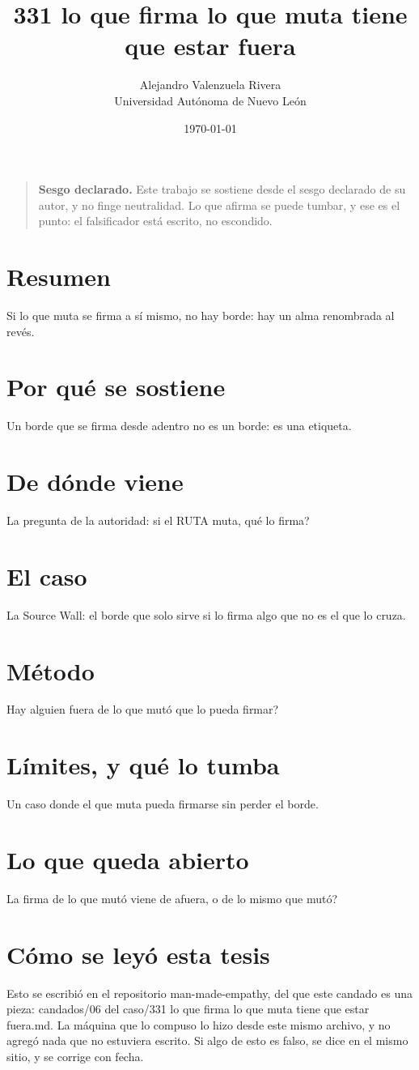 \documentclass[11pt,a4paper]{article}
\title{331 lo que firma lo que muta tiene que estar fuera}
\author{Alejandro Valenzuela Rivera\\\small Universidad Autónoma de Nuevo León}
\date{\today}
\begin{document}
\maketitle

\begin{quote}
\textbf{Sesgo declarado.} Este trabajo se sostiene desde el sesgo declarado de su autor, y no finge neutralidad. Lo que afirma se puede tumbar, y ese es el punto: el falsificador está escrito, no escondido.
\end{quote}

\section*{Resumen}
Si lo que muta se firma a sí mismo, no hay borde: hay un alma renombrada al revés.

\section{Por qué se sostiene}
Un borde que se firma desde adentro no es un borde: es una etiqueta.

\section{De dónde viene}
La pregunta de la autoridad: si el RUTA muta, \textquestiondown{}qué lo firma?

\section{El caso}
La Source Wall: el borde que solo sirve si lo firma algo que no es el que lo cruza.

\section{Método}
\textquestiondown{}Hay alguien fuera de lo que mutó que lo pueda firmar?

\section{Límites, y qué lo tumba}
Un caso donde el que muta pueda firmarse sin perder el borde.

\section{Lo que queda abierto}
\textquestiondown{}La firma de lo que mutó viene de afuera, o de lo mismo que mutó?

\section*{Cómo se leyó esta tesis}
Esto se escribió en el repositorio man-made-empathy, del que este candado es una pieza: candados/06 del caso/331 lo que firma lo que muta tiene que estar fuera.md. La máquina que lo compuso lo hizo desde este mismo archivo, y no agregó nada que no estuviera escrito. Si algo de esto es falso, se dice en el mismo sitio, y se corrige con fecha.
\end{document}
